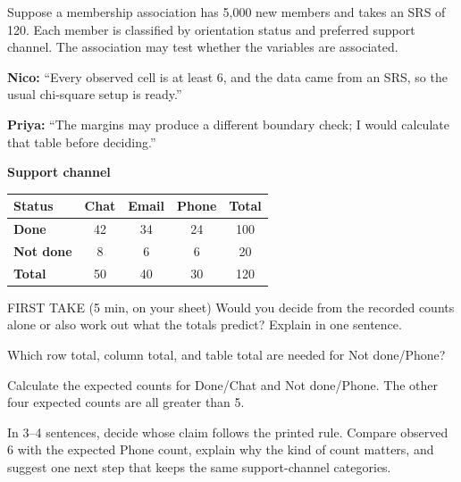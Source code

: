 \documentclass[14pt]{extarticle}
\begin{document}
\pagestyle{empty}


\noindent\begin{minipage}[t]{0.57\linewidth}
\vspace{0pt}
Suppose a membership association has 5,000 new members and takes an SRS of 120. Each member is classified by orientation status and preferred support channel. The association may test whether the variables are associated.\par\smallskip \textbf{Nico:} ``Every observed cell is at least 6, and the data came from an SRS, so the usual chi-square setup is ready.''\par \textbf{Priya:} ``The margins may produce a different boundary check; I would calculate that table before deciding.''\par
\end{minipage}\hfill
\begin{minipage}[t]{0.40\linewidth}
\vspace{0pt}
\begin{center}
\textbf{Support channel}\par\smallskip
\begin{tabular}{|l|c|c|c|c|}
\hline
\textbf{Status} & \textbf{Chat} & \textbf{Email} & \textbf{Phone} & \textbf{Total} \\ \hline
\textbf{Done} & 42 & 34 & 24 & 100 \\ \hline
\textbf{Not done} & 8 & 6 & 6 & 20 \\ \hline
\textbf{Total} & 50 & 40 & 30 & 120 \\ \hline
\end{tabular}
\end{center}
\end{minipage}

\begin{firsttakebox}{FIRST TAKE (5 min, on your sheet)}
Would you decide from the recorded counts alone or also work out what the totals predict? Explain in one sentence.
\end{firsttakebox}

\begin{description}[leftmargin=1.15in, labelwidth=1in, itemsep=2pt, topsep=2pt]
  \item[\dokbadge{1}~(a)] Which row total, column total, and table total are needed for Not done/Phone?
  \item[\dokbadge{2}~(b)] Calculate the expected counts for Done/Chat and Not done/Phone. The other four expected counts are all greater than 5.
  \item[\dokbadge{3}~(c)] In 3--4 sentences, decide whose claim follows the printed rule. Compare observed 6 with the expected Phone count, explain why the kind of count matters, and suggest one next step that keeps the same support-channel categories.
\end{description}
\end{document}
